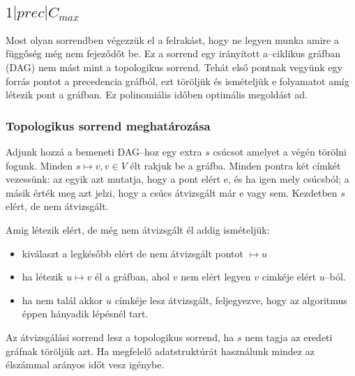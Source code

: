 \subsection{ \texorpdfstring {$ 1|prec|C_{max} $} {1|prec|Cmax} }

Most olyan sorrendben végezzük el a felrakást, hogy ne legyen munka amire a
függőség még nem fejeződőt be. Ez a sorrend egy irányított a--ciklikus gráfban
(DAG) nem mást mint a topologikus sorrend. Tehát első pontnak vegyünk egy forrás
pontot a precedencia gráfból, ezt töröljük és ismételjük e folyamatot amíg
létezik pont a gráfban. Ez polinomiális időben optimális megoldást ad.

\subsubsection{Topologikus sorrend meghatározása}

Adjunk hozzá a bemeneti DAG--hoz egy extra $s$ csúcsot amelyet a végén törölni
fogunk. Minden $s \mapsto v, v \in V$ élt rakjuk be a gráfba. Minden pontra két
címkét vezessünk: az egyik azt mutatja, hogy a pont elért e, és ha igen mely
csúcsból; a másik érték meg azt jelzi, hogy a csúcs átvizsgált már e vagy sem.
Kezdetben $s$ elért, de nem átvizsgált.

Amig létezik elért, de még nem átvizsgált él addig ismételjük:

\begin{itemize}
	\item kiválaszt a legkésőbb elért de nem átvizsgált pontot $\mapsto u$
	\item ha létezik $u \mapsto v$ él a gráfban, ahol $v$ nem elért legyen $v$
	      cimkéje elért $u$--ból.
	\item ha nem talál akkor $u$ címkéje lesz átvizsgált, feljegyezve, hogy az
	      algoritmus éppen hányadik lépésnél tart.
\end{itemize}

Az átvizsgálási sorrend lesz a topologikus sorrend, ha $s$ nem tagja az eredeti
gráfnak töröljük azt. Ha megfelelő adatstruktúrát használunk mindez az élszámmal
arányos időt vesz igénybe.


